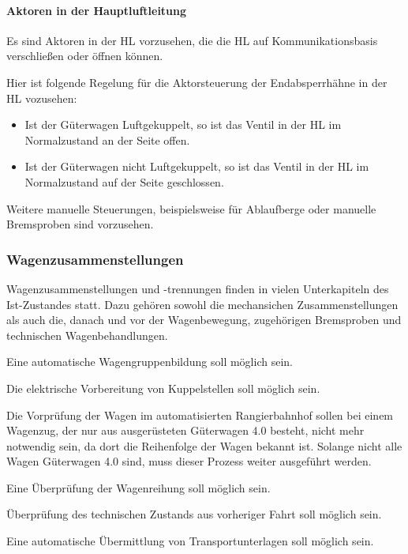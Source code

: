 \paragraph{Aktoren in der Hauptluftleitung}
\begin{feat}
Es sind Aktoren in der HL vorzusehen, die die HL auf Kommunikationsbasis verschließen oder öffnen können.
\end{feat}
\begin{rem}
Hier ist folgende Regelung für die Aktorsteuerung der Endabsperrhähne in der HL vozusehen:
\begin{itemize}
    \item Ist der Güterwagen Luftgekuppelt, so ist das Ventil in der HL im Normalzustand an der Seite offen.
    \item Ist der Güterwagen nicht Luftgekuppelt, so ist das Ventil in der HL im Normalzustand auf der Seite geschlossen.
\end{itemize}
\end{rem}
\begin{rem}
Weitere manuelle Steuerungen, beispielsweise für Ablaufberge oder manuelle Bremsproben sind vorzusehen.
\end{rem}

\subsubsection{Wagenzusammenstellungen}
Wagenzusammenstellungen und -trennungen finden in vielen Unterkapiteln des Ist-Zustandes statt. Dazu gehören sowohl die mechansichen Zusammenstellungen als auch die, danach und vor der Wagenbewegung, zugehörigen Bremsproben und technischen Wagenbehandlungen.
\begin{feat}
Eine automatische Wagengruppenbildung soll möglich sein.
\end{feat}
\begin{feat}
Die elektrische Vorbereitung von Kuppelstellen soll möglich sein.
\end{feat}
Die Vorprüfung der Wagen im automatisierten Rangierbahnhof sollen bei einem Wagenzug, der nur aus ausgerüsteten Güterwagen 4.0 besteht, nicht mehr notwendig sein, da dort die Reihenfolge der Wagen bekannt ist. Solange nicht alle Wagen Güterwagen 4.0 sind, muss dieser Prozess weiter ausgeführt werden.
\begin{feat}
Eine Überprüfung der Wagenreihung soll möglich sein.
\end{feat}
\begin{feat}
Überprüfung des technischen Zustands aus vorheriger Fahrt soll möglich sein.
\end{feat}
\begin{feat}
Eine automatische Übermittlung von Transportunterlagen soll möglich sein.
\end{feat}

